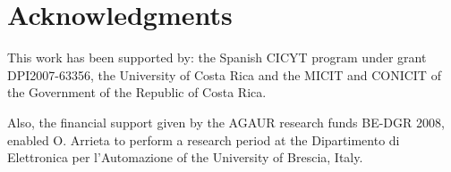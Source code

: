 %
\section*{Acknowledgments}
%

This work has been supported by: the Spanish CICYT program under
grant DPI2007-63356, the University of Costa Rica and the MICIT
and CONICIT of the Government of the Republic of Costa Rica.

Also, the financial support given by the AGAUR research funds
BE-DGR 2008, enabled O. Arrieta to perform a research period at
the Dipartimento di Elettronica per l'Automazione of the
University of Brescia, Italy.
